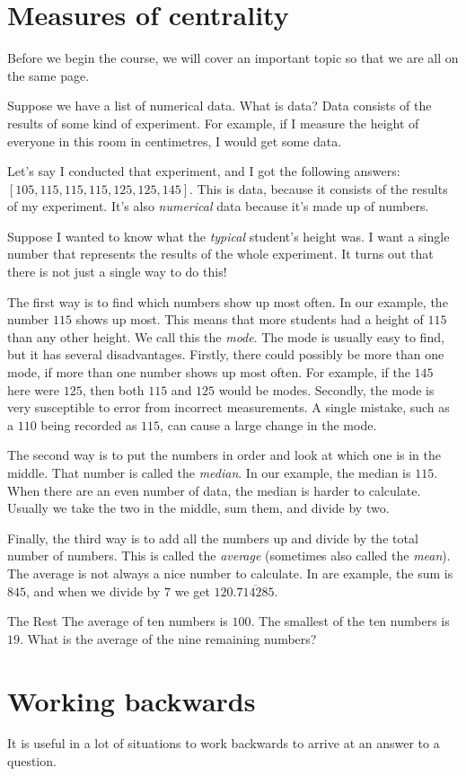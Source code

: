 \documentclass[a4paper,10pt]{report}
\begin{document}
\section{Measures of centrality}

Before we begin the course, we will cover an important topic so that we are all
on the same page.

Suppose we have a list of numerical data. What is data? Data  consists of the
results of some kind of experiment. For example, if I measure the height of
everyone in this room in centimetres, I would get some data.

Let's say I conducted that experiment, and I got the following answers: $[105,
115, 115, 115, 125, 125, 145]$. This is data, because it consists of the results
of my experiment. It's also \emph{numerical} data because it's made up of
numbers.

Suppose I wanted to know what the \emph{typical} student's height was. I want a
single number that represents the results of the whole experiment. It turns out
that there is not just a single way to do this!

The first way is to find which numbers show up most often. In our example, the
number $115$ shows up most. This means that more students had a height of $115$
than any other height. We call this the \emph{mode}. The mode is usually easy to
find, but it has several disadvantages. Firstly, there could possibly be more
than one mode, if more than one number shows up most often. For example, if the
$145$ here were $125$, then both $115$ and $125$ would be modes. Secondly, the
mode is very susceptible to error from incorrect measurements. A single mistake,
such as a $110$ being recorded as $115$, can cause a large change in the mode.

The second way is to put the numbers in order and look at which one is in the
middle. That number is called the \emph{median}. In our example, the median is
$115$. When there are an even number of data, the median is harder to calculate.
Usually we take the two in the middle, sum them, and divide by two.

Finally, the third way is to add all the numbers up and divide by the total
number of numbers. This is called the \emph{average} (sometimes also called the
\emph{mean}). The average is not always a nice number to calculate. In are
example, the sum is $845$, and when we divide by $7$ we get
$120.\overline{714285}$.

\begin{problem}{The Rest}
 The average of ten numbers is $100$. The smallest of the ten numbers is $19$.
 What is the average of the nine remaining numbers?
\end{problem}

\section{Working backwards}

It is useful in a lot of situations to work backwards to arrive at an answer to
a question.
\end{document}
